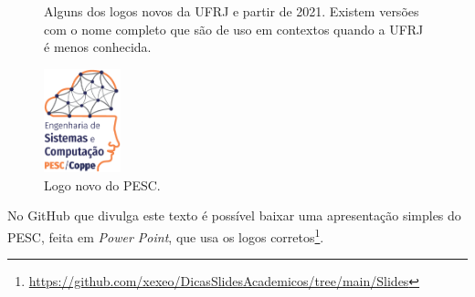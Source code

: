 \begin{figure}
    \centering
    \caption{Alguns dos logos novos da  UFRJ e partir de 2021. Existem versões com o nome completo que são de uso em contextos quando a UFRJ é menos conhecida.}
    \label{fig:logoufrj}
\end{figure}

\begin{figure}
    \centering
    \includegraphics[height=3cm]{imagens/logoPrincipal.eps}
    \caption{Logo novo do PESC.}
    \label{fig:logopesc}
\end{figure}



No GitHub que divulga este texto é possível baixar uma apresentação simples do PESC, feita em \textit{Power Point}, que usa os logos corretos\footnote{\url{https://github.com/xexeo/DicasSlidesAcademicos/tree/main/Slides}}.



